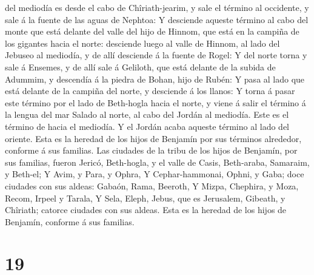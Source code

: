 del mediodía es desde el cabo de Chîriath-jearim, y sale el término al
occidente, y sale á la fuente de las aguas de Nephtoa:  Y
desciende aqueste término al cabo del monte que está delante del valle
del hijo de Hinnom, que está en la campiña de los gigantes hacia el
norte: desciende luego al valle de Hinnom, al lado del Jebuseo al
mediodía, y de allí desciende á la fuente de Rogel:  Y del
norte torna y sale á Ensemes, y de allí sale á Geliloth, que está
delante de la subida de Adummim, y descendía á la piedra de Bohan, hijo
de Rubén:  Y pasa al lado que está delante de la campiña
del norte, y desciende á los llanos:  Y torna á pasar este
término por el lado de Beth-hogla hacia el norte, y viene á salir el
término á la lengua del mar Salado al norte, al cabo del Jordán al
mediodía. Este es el término de hacia el mediodía.  Y el
Jordán acaba aqueste término al lado del oriente. Esta es la heredad de
los hijos de Benjamín por sus términos alrededor, conforme á sus
familias.  Las ciudades de la tribu de los hijos de
Benjamín, por sus familias, fueron Jericó, Beth-hogla, y el valle de
Casis,  Beth-araba, Samaraim, y Beth-el;  Y
Avim, y Para, y Ophra,  Y Cephar-hammonai, Ophni, y Gaba;
doce ciudades con sus aldeas:  Gabaón, Rama, Beeroth,
 Y Mizpa, Chephira, y Moza,  Recom, Irpeel y
Tarala,  Y Sela, Eleph, Jebus, que es Jerusalem, Gibeath, y
Chîriath; catorce ciudades con sus aldeas. Esta es la heredad de los
hijos de Benjamín, conforme á sus familias.

\hypertarget{section-18}{%
\section{19}\label{section-18}}

